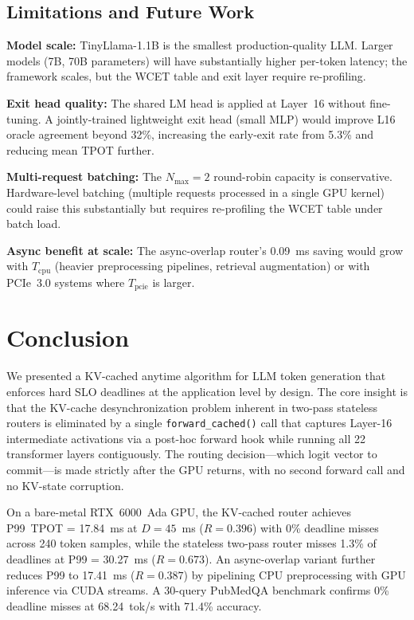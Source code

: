 \documentclass[conference]{IEEEtran}
\begin{document}
\subsection{Limitations and Future Work}

\textbf{Model scale:}
TinyLlama-1.1B is the smallest production-quality LLM.
Larger models (7B, 70B parameters) will have substantially higher
per-token latency; the framework scales, but the WCET table and exit
layer require re-profiling.

\textbf{Exit head quality:}
The shared LM head is applied at Layer~16 without fine-tuning.
A jointly-trained lightweight exit head (small MLP) would improve
L16 oracle agreement beyond 32\%, increasing the early-exit rate
from 5.3\% and reducing mean TPOT further.

\textbf{Multi-request batching:}
The $N_{\max}=2$ round-robin capacity is conservative.
Hardware-level batching (multiple requests processed in a single
GPU kernel) could raise this substantially but requires re-profiling
the WCET table under batch load.

\textbf{Async benefit at scale:}
The async-overlap router's 0.09~ms saving would grow with
$T_{\text{cpu}}$ (heavier preprocessing pipelines, retrieval
augmentation) or with PCIe~3.0 systems where $T_{\text{pcie}}$
is larger.

\section{Conclusion}

We presented a KV-cached anytime algorithm for LLM token generation that
enforces hard SLO deadlines at the application level by design.
The core insight is that the KV-cache desynchronization problem inherent
in two-pass stateless routers is eliminated by a single
\texttt{forward\_cached()} call that captures Layer-16 intermediate
activations via a post-hoc forward hook while running all 22 transformer
layers contiguously.
The routing decision---which logit vector to commit---is made strictly
after the GPU returns, with no second forward call and no KV-state
corruption.

On a bare-metal RTX~6000~Ada GPU, the KV-cached router achieves
P99~TPOT = 17.84~ms at $D=45$~ms ($R=0.396$) with 0\% deadline misses
across 240 token samples, while the stateless two-pass router misses
1.3\% of deadlines at P99 = 30.27~ms ($R=0.673$).
An async-overlap variant further reduces P99 to 17.41~ms ($R=0.387$)
by pipelining CPU preprocessing with GPU inference via CUDA streams.
A 30-query PubMedQA benchmark confirms 0\% deadline misses at
68.24~tok/s with 71.4\% accuracy.
\end{document}

